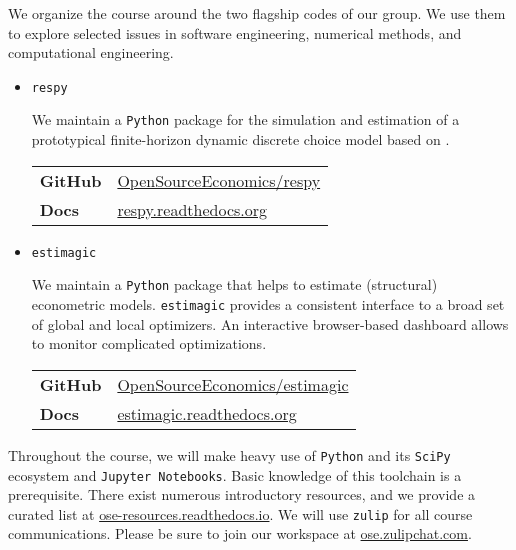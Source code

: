 





\nobibliography*




\noindent We organize the course around the two flagship codes of our group. We use them to explore selected issues in software engineering, numerical methods, and computational engineering.

\begin{itemize}

\item \verb+respy+

We maintain a \verb+Python+ package for the simulation and estimation of a prototypical finite-horizon dynamic discrete choice model based on \citet{Keane.1997}.\vspace{0.3cm}

\begin{tabular}{ll}
\textbf{GitHub}        & \url{OpenSourceEconomics/respy}\\
\textbf{Docs}     & \url{respy.readthedocs.org}
\end{tabular}\vspace{0.3cm}

\item \verb+estimagic+

We maintain a \verb+Python+ package that helps to estimate (structural) econometric models. \verb+estimagic+ provides a consistent interface to a broad set of global and local optimizers. An interactive browser-based dashboard  allows to monitor complicated optimizations.\vspace{0.3cm}

\begin{tabular}{ll}
\textbf{GitHub}        & \url{OpenSourceEconomics/estimagic}\\
\textbf{Docs}     & \url{estimagic.readthedocs.org}
\end{tabular}\vspace{0.3cm}
\end{itemize}

\noindent Throughout the course, we will make heavy use of \verb+Python+ and its \verb+SciPy+ ecosystem and \verb+Jupyter Notebooks+. Basic knowledge of this toolchain is a prerequisite. There exist numerous introductory resources, and we provide a curated list at \url{ose-resources.readthedocs.io}. We will use \verb+zulip+ for all course communications. Please be sure to join our workspace at \url{ose.zulipchat.com}.

